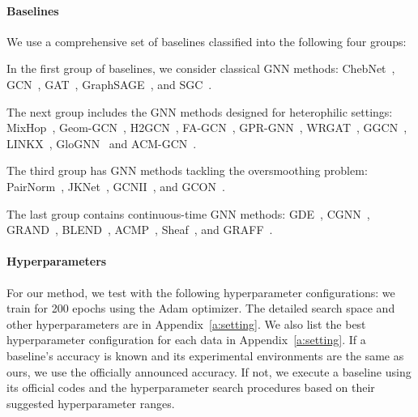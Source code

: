 \documentclass{article}
\theoremstyle{plain}
\theoremstyle{definition}
\theoremstyle{remark}
\begin{document}
\paragraph{Baselines} We use a comprehensive set of baselines classified into the following four groups:
\begin{compactenum}
    \item In the first group of baselines, we consider classical GNN methods: ChebNet~\cite{defferrard2016chebnet}, GCN~\cite{kipf2017GCN}, GAT~\cite{velickovic2018GAT}, GraphSAGE~\cite{hamilton2017graphSAGE}, and SGC~\cite{Wu2019SGC}.
    \item The next group includes the GNN methods designed for heterophilic settings: MixHop~\cite{abu2019mixhop}, Geom-GCN~\cite{pei2020geomGCN}, H2GCN~\cite{zhu2020h2gcn}, FA-GCN~\cite{Bo2021fagcn}, GPR-GNN~\cite{chien2021GPRGNN}, WRGAT~\cite{suresh2021WRGAT}, GGCN~\cite{yan2021GGCN}, LINKX~\cite{lim2022LINKX}, GloGNN~\cite{li2022GloGNN} and ACM-GCN~\cite{luan2022ACMGCN}.
    \item The third group has GNN methods tackling the oversmoothing problem: PairNorm~\cite{zhao2020pairnorm}, JKNet~\cite{xu2018jknet}, GCNII~\cite{chen2020gcnii}, and GCON~\cite{rusch2022gcon}.
    \item The last group contains continuous-time GNN methods: GDE~\cite{poli2019gde}, CGNN~\cite{xhonneux2019CGNN}, GRAND~\cite{chamberlain2021grand}, BLEND~\cite{chamberlain2021blend}, ACMP~\cite{wang2023acmp}, Sheaf~\cite{bodnar2022Sheaf}, and GRAFF~\cite{giovanni2022GRAFF}.
\end{compactenum}

\paragraph{Hyperparameters} For our method, we test with the following hyperparameter configurations: we train for 200 epochs using the Adam optimizer. The detailed search space and other hyperparameters are in Appendix~\ref{a:setting}. We also list the best hyperparameter configuration for each data in Appendix~\ref{a:setting}. If a baseline's accuracy is known and its experimental environments are the same as ours, we use the officially announced accuracy. If not, we execute a baseline using its official codes and the hyperparameter search procedures based on their suggested hyperparameter ranges.
\end{document}
